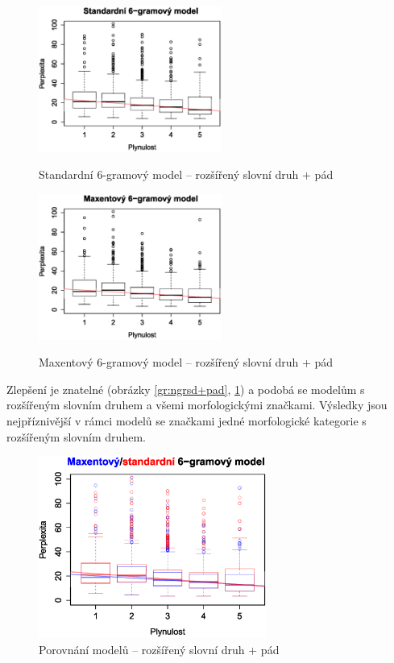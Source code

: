 \documentclass[12pt,a4paper]{report}
\begin{document}
\begin{figure}[!htb]
\begin{center}
  \centering\includegraphics[width=60mm]{./grafy/morf/ngram/rsd+pad.svg.eps}
  \caption{Standardní 6-gramový model -- rozšířený slovní druh + pád}\label{gr:ngrsd+pad}
\endminipage\quad
{}
  \centering\includegraphics[width=60mm]{./grafy/morf/maxent/rsd+pad.svg.eps}
  \caption{Maxentový 6-gramový model -- rozšířený slovní druh + pád}\label{gr:maxrsd+pad}
\endminipage
\end{center}
\end{figure}

Zlepšení je znatelné (obrázky \ref{gr:ngrsd+pad}, \ref{gr:maxrsd+pad}) a podobá se modelům s rozšířeným slovním druhem a všemi morfologickými značkami. Výsledky jsou nejpříznivější v rámci modelů se značkami jedné morfologické kategorie s rozšířeným slovním druhem.

\begin{figure}[!htbp]
\begin{center}
	\centering
	\includegraphics[width=75mm]{./grafy/morf/porovnani/rsd+pad.eps}	
	\caption{Porovnání modelů -- rozšířený slovní druh + pád}\label{gr:porrsd+pad}
\endminipage
\end{center}
\end{figure}
\end{document}
